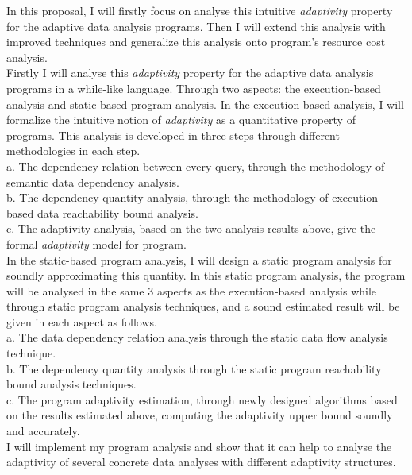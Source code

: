    In this proposal, I will firstly focus on analyse this intuitive \emph{adaptivity} property for the adaptive data analysis programs. 
   Then I will extend this analysis with improved techniques and generalize this analysis onto program's resource cost analysis.
   \\
   Firstly I will analyse this \emph{adaptivity} property for the adaptive data analysis programs in a while-like language.
   Through two aspects: the execution-based analysis and static-based program analysis.
	In the execution-based analysis, I will formalize the intuitive notion of \emph{adaptivity} as a quantitative 
   property of programs. This analysis is developed in three steps through different methodologies in each step. 
   \\
	a. The dependency relation between every query, through the methodology of semantic data dependency analysis.
   \\
	b. The dependency quantity analysis, through the methodology of execution-based data reachability bound analysis.
   \\
	c. The adaptivity analysis, based on the two analysis results above, give the formal \emph{adaptivity} model 
   for program.
   \\   
	In the static-based program analysis, I will design a static program analysis for soundly approximating this quantity.
   In this static program analysis, the program will be analysed in the same 3 aspects as the execution-based analysis 
   while through static program analysis techniques, and a sound estimated result will be given in each aspect as follows.
   \\
	a. The data dependency relation analysis through the static data flow analysis technique.
   \\
	b. The dependency quantity analysis through the static program reachability bound analysis techniques.
   \\
	c. The program adaptivity estimation, through newly designed algorithms based on the results estimated above, 
   computing the adaptivity upper bound soundly 
   and accurately.
   \\
   I will implement my program analysis and show that it can help to analyse the adaptivity of several concrete data analyses with different adaptivity structures.


